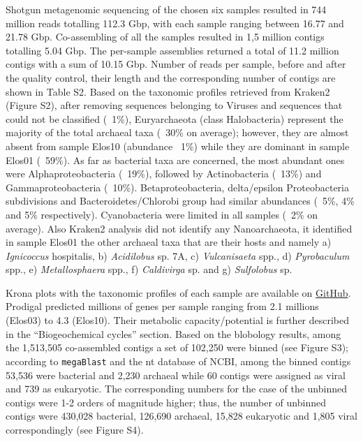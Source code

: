    Shotgun metagenomic sequencing of the chosen six samples resulted in 744 million reads totalling 112.3 Gbp, with each sample ranging between 16.77 and 21.78 Gbp. 
   Co-assembling of all the samples resulted in 1,5 million contigs totalling 5.04 Gbp. 
   The per-sample assemblies returned a total of 11.2 million contigs with a sum of 10.15 Gbp. 
   Number of reads per sample, before and after the quality control, their length and the corresponding number of contigs are shown in Table S2. 
   Based on the taxonomic profiles retrieved from Kraken2 (Figure S2), after removing sequences belonging to Viruses and sequences that could not be classified (~1\%), 
   Euryarchaeota (class Halobacteria) represent the majority of the total archaeal taxa (~30\% on average); 
   however, they are almost absent from sample Elos10 (abundance ~1\%) while they are dominant in sample Elos01 (~59\%). 
   As far as bacterial taxa are concerned, the most abundant ones were Alphaproteobacteria (~19\%), followed by Actinobacteria (~13\%) and Gammaproteobacteria (~10\%). 
   Betaproteobacteria, delta/epsilon Proteobacteria subdivisions and Bacteroidetes/Chlorobi group had similar abundances (~5\%, 4\% and 5\% respectively). 
   Cyanobacteria were limited in all samples (~2\% on average). 
   Also Kraken2 analysis did not identify any Nanoarchaeota, it identified in sample Elos01 the other archaeal taxa that are their hosts and namely 
   a) \textit{Ignicoccus} hospitalis, b) \textit{Acidilobus} sp. 7A, c) \textit{Vulcanisaeta} spp., d) \textit{Pyrobaculum} spp., 
   e) \textit{Metallosphaera} spp., f) \textit{Caldivirga} sp. and g) \textit{Sulfolobus} sp. 

   Krona plots with the taxonomic profiles of each sample are available on 
   \href{https://github.com/hariszaf/karpathos-swamp/tree/main/metaWRAP/Kraken2}{GitHub}. 
   Prodigal predicted millions of genes per sample ranging from 2.1 millions (Elos03) to 4.3 (Elos10). 
   Their metabolic capacity/potential is further described in the “Biogeochemical cycles” section. 
   Based on the blobology results, among the 1,513,505 co-assembled contigs a set of 102,250 were binned (see Figure S3); 
   according to \texttt{megaBlast} and the nt database of NCBI, among the binned contigs 53,536 were bacterial and 2,230 archaeal while 60 contigs were assigned as viral and 739 as eukaryotic. 
   The corresponding numbers for the case of the unbinned contigs were 1-2 orders of magnitude higher; 
   thus, the number of unbinned contigs were 430,028 bacterial, 126,690 archaeal, 15,828 eukaryotic and 1,805  viral correspondingly  (see Figure S4). 


